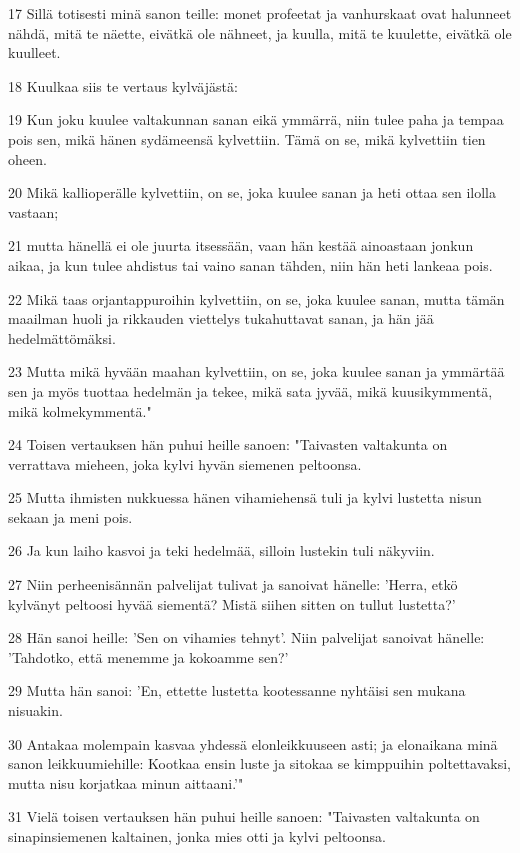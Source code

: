\par 17 Sillä totisesti minä sanon teille: monet profeetat ja vanhurskaat ovat halunneet nähdä, mitä te näette, eivätkä ole nähneet, ja kuulla, mitä te kuulette, eivätkä ole kuulleet.
\par 18 Kuulkaa siis te vertaus kylväjästä:
\par 19 Kun joku kuulee valtakunnan sanan eikä ymmärrä, niin tulee paha ja tempaa pois sen, mikä hänen sydämeensä kylvettiin. Tämä on se, mikä kylvettiin tien oheen.
\par 20 Mikä kallioperälle kylvettiin, on se, joka kuulee sanan ja heti ottaa sen ilolla vastaan;
\par 21 mutta hänellä ei ole juurta itsessään, vaan hän kestää ainoastaan jonkun aikaa, ja kun tulee ahdistus tai vaino sanan tähden, niin hän heti lankeaa pois.
\par 22 Mikä taas orjantappuroihin kylvettiin, on se, joka kuulee sanan, mutta tämän maailman huoli ja rikkauden viettelys tukahuttavat sanan, ja hän jää hedelmättömäksi.
\par 23 Mutta mikä hyvään maahan kylvettiin, on se, joka kuulee sanan ja ymmärtää sen ja myös tuottaa hedelmän ja tekee, mikä sata jyvää, mikä kuusikymmentä, mikä kolmekymmentä."
\par 24 Toisen vertauksen hän puhui heille sanoen: "Taivasten valtakunta on verrattava mieheen, joka kylvi hyvän siemenen peltoonsa.
\par 25 Mutta ihmisten nukkuessa hänen vihamiehensä tuli ja kylvi lustetta nisun sekaan ja meni pois.
\par 26 Ja kun laiho kasvoi ja teki hedelmää, silloin lustekin tuli näkyviin.
\par 27 Niin perheenisännän palvelijat tulivat ja sanoivat hänelle: 'Herra, etkö kylvänyt peltoosi hyvää siementä? Mistä siihen sitten on tullut lustetta?'
\par 28 Hän sanoi heille: 'Sen on vihamies tehnyt'. Niin palvelijat sanoivat hänelle: 'Tahdotko, että menemme ja kokoamme sen?'
\par 29 Mutta hän sanoi: 'En, ettette lustetta kootessanne nyhtäisi sen mukana nisuakin.
\par 30 Antakaa molempain kasvaa yhdessä elonleikkuuseen asti; ja elonaikana minä sanon leikkuumiehille: Kootkaa ensin luste ja sitokaa se kimppuihin poltettavaksi, mutta nisu korjatkaa minun aittaani.'"
\par 31 Vielä toisen vertauksen hän puhui heille sanoen: "Taivasten valtakunta on sinapinsiemenen kaltainen, jonka mies otti ja kylvi peltoonsa.
